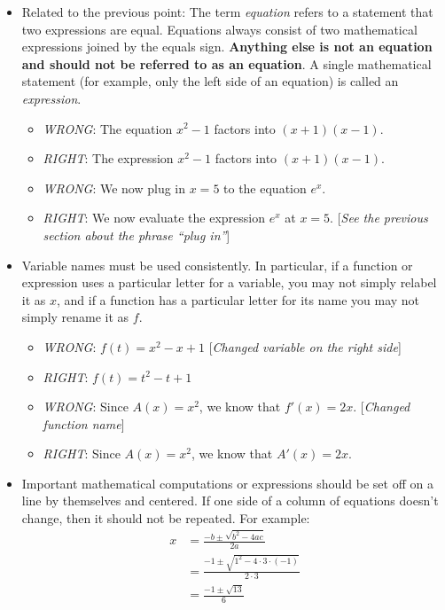 \documentclass[11pt]{article}
\begin{document}
\begin{itemize}
	\item Related to the previous point: The term \emph{equation} refers to a statement that two expressions are equal. Equations always consist of two mathematical expressions joined by the equals sign. \textbf{Anything else is not an equation and should not be referred to as an equation}. A single mathematical statement (for example, only the left side of an equation) is called an \emph{expression}. 
		\begin{itemize}
			\item \emph{WRONG}: The equation $x^2 - 1$ factors into $(x+1)(x-1)$. 
			\item \emph{RIGHT}: The expression $x^2 - 1$ factors into $(x+1)(x-1)$. 
			\item \emph{WRONG}: We now plug in $x=5$ to the equation $e^x$. 
			\item \emph{RIGHT}: We now evaluate the expression $e^x$ at $x=5$. [\emph{See the previous section about the phrase ``plug in''}]
		\end{itemize}
	
	
		
	\item Variable names must be used consistently. In particular, if a function or expression uses a particular letter for a variable, you may not simply relabel it as $x$, and if a function has a particular letter for its name you may not simply rename it as $f$. 
	\begin{itemize}
		\item \emph{WRONG}: $f(t) = x^2 - x + 1$  [\emph{Changed variable on the right side}]
		\item \emph{RIGHT}: $f(t) = t^2 - t + 1$
		\item \emph{WRONG}: Since $A(x) = x^2$, we know that $f'(x) = 2x$. [\emph{Changed function name}]
		\item \emph{RIGHT}: Since $A(x) = x^2$, we know that $A'(x) = 2x$. 
	\end{itemize}
		
	\item Important mathematical computations or expressions should be set off on a line by themselves and centered. If one side of a column of equations doesn't change, then it should not be repeated. For example: 
		\begin{align*}
			x &= \frac{-b \pm \sqrt{b^2 - 4ac}}{2a} \\
			  &= \frac{-1 \pm \sqrt{1^2 - 4 \cdot 3 \cdot (-1)}}{2 \cdot 3} \\
			 &= \frac{-1 \pm \sqrt{13}}{6}
		\end{align*}
		

\end{itemize}
\end{document}
